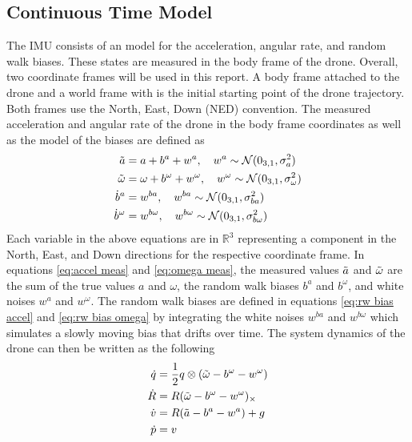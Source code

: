 \subsection{Continuous Time Model}
The IMU consists of an model for the acceleration, angular rate, and random walk biases. These states are measured in the body frame of the drone. Overall, two coordinate frames will be used in this report. A body frame attached to the drone and a world frame with is the initial starting point of the drone trajectory. Both frames use the North, East, Down (NED) convention. The measured acceleration and angular rate of the drone in the body frame coordinates as well as the model of the biases are defined as
\begin{subequations} \label{eq: measurement model}
    \begin{align}
        \Tilde{a} &= a + b^a + w^a, \quad w^a \sim \mathcal{N}(0_{3,1}, \sigma_{a}^2) \label{eq:accel meas} \\
        \Tilde{\omega} &= \omega + b^{\omega} + w^{\omega}, \quad w^{\omega} \sim \mathcal{N}(0_{3,1}, \sigma_{\omega}^2) \label{eq:omega meas} \\
        \dot{b}^a &= w^{ba}, \quad w^{ba} \sim \mathcal{N}(0_{3,1}, \sigma_{ba}^2) \label{eq:rw bias accel} \\
        \dot{b}^{\omega} &= w^{b\omega}, \quad w^{b\omega} \sim \mathcal{N}(0_{3,1}, \sigma_{b\omega}^2) \label{eq:rw bias omega}
    \end{align}
\end{subequations}
Each variable in the above equations are in $\mathbb{R}^3$ representing a component in the North, East, and Down directions for the respective coordinate frame. In equations \eqref{eq:accel meas} and \eqref{eq:omega meas}, the measured values $\Tilde{a}$ and $\Tilde{\omega}$ are the sum of the true values $a$ and $\omega$, the random walk biases $b^a$ and $b^{\omega}$, and white noises $w^a$ and $w^{\omega}$. The random walk biases are defined in equations \eqref{eq:rw bias accel} and \eqref{eq:rw bias omega} by integrating the white noises $w^{ba}$ and $w^{b\omega}$ which simulates a slowly moving bias that drifts over time. The system dynamics of the drone can then be written as the following
\begin{subequations} \label{eq: state dynamics}
    \begin{align}
        \dot{q} &= \frac{1}{2} q \otimes (\Tilde{\omega} - b^{\omega} - w^{\omega}) \label{eq:q dot} \\
        \dot{R} &= R (\Tilde{\omega} - b^{\omega} - w^{\omega})_{\times} \label{eq:R dot} \\
        \dot{v} &= R (\Tilde{a} - b^{a} - w^{a}) + g \label{eq:v dot} \\
        \dot{p} &= v \label{eq:p dot}
    \end{align}
\end{subequations}

